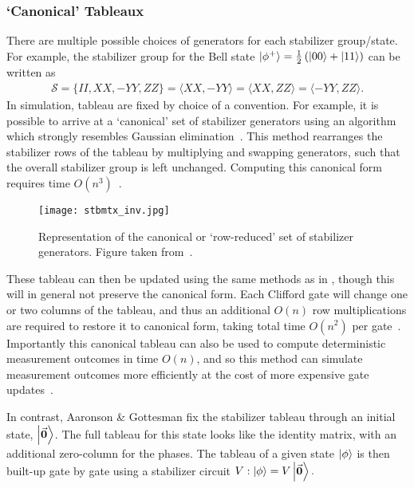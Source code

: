 \subsubsection{`Canonical' Tableaux}
There are multiple possible choices of generators for each stabilizer group/state. For example, the stabilizer group for the Bell state $\ket{\phi^{+}}=\frac{1}{2}\left(\ket{00}+\ket{11}\right)$ can be written as
\begin{align}
    \mathcal{S} = \{II, XX, -YY, ZZ\} = \langle XX,-YY\rangle = \langle XX, ZZ\rangle = \langle -YY,ZZ\rangle.
\end{align}
In simulation, tableau are fixed by choice of a convention. For example, it is possible to arrive at a `canonical' set of stabilizer generators using an algorithm which strongly resembles Gaussian elimination~\cite{Garcia2012}. This method rearranges the stabilizer rows of the tableau by multiplying and swapping generators, such that the overall stabilizer group is left unchanged. Computing this canonical form requires  time $O(n^{3})$~\cite{Garcia2012}.
\begin{figure}[H]
    \centering
    \texttt{[image: stbmtx\_inv.jpg]}
    \caption{Representation of the canonical or `row-reduced' set of stabilizer generators. Figure taken from~\cite{Garcia2012}.}
\label{fig:canoncialtableau}
\end{figure}
These tableau can then be updated using the same methods as in \cite{Aaronson2004}, though this will in general not preserve the canonical form. Each Clifford gate will change one or two columns of the tableau, and thus an additional $O(n)$ row multiplications are required to restore it to canonical form, taking total time $O(n^{2})$ per gate~\cite{Garcia2015}.
Importantly this canonical tableau can also be used to compute deterministic measurement outcomes in time $O(n)$, and so this method can simulate measurement outcomes more efficiently at the cost of more expensive gate updates~\cite{Garcia2015}.\par
In contrast, Aaronson \& Gottesman fix the stabilizer tableau through an initial state, $\ket{\va{0}}$. The full tableau for this state looks like the identity matrix, with an additional zero-column for the phases. The tableau of a given state $\ket{\phi}$ is then built-up gate by gate using a stabilizer circuit $V:\ket{\phi}=V\ket{\va{0}}.$

